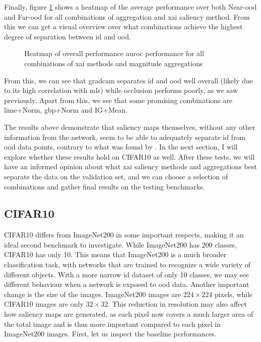 \documentclass[UKenglish]{uiomasterthesis} %
\theoremstyle{definition}
\begin{document}
Finally, figure \ref{fig:imagenet200_heatmap} shows a heatmap of the average performance over both Near-\ac{ood} and Far-\ac{ood} for all combinations of aggregation and \ac{xai} saliency method. From this we can get a visual overview over what combinations achieve the highest degree of separation between \ac{id} and \ac{ood}.

\begin{figure}[H]
    \begin{center}
        
    \end{center}
    \caption[Overall performance on ImageNet200]{Heatmap of overall performance \ac{auroc} performance for all combinations of \ac{xai} methods and magnitude aggregations}
    \label{fig:imagenet200_heatmap}
\end{figure}

From this, we can see that \ac{gradcam} separates \ac{id} and \ac{ood} well overall (likely due to its high correlation with \ac{mls}) while occlusion performs poorly, as we saw previously. Apart from this, we see that some promising combinations are \ac{lime}+Norm, \ac{gbp}+Norm and IG+Mean.

The results above demonstrate that saliency maps themselves, without any other information from the network, seem to be able to adequately separate \ac{id} from \ac{ood} data points, contrary to what was found by \cite{martinez}. In the next section, I will explore whether these results hold on CIFAR10 as well. After these tests, we will have an informed opinion about what \ac{xai} saliency methods and aggregations best separate the data on the validation set, and we can choose a selection of combinations and gather final results on the testing benchmarks.

\subsection{CIFAR10}

CIFAR10 differs from ImageNet200 in some important respects, making it an ideal second benchmark to investigate. While ImageNet200 has 200 classes, CIFAR10 has only 10. This means that ImageNet200 is a much broader classification task, with networks that are trained to recognize a wide variety of different objects. With a more narrow \ac{id} dataset of only 10 classes, we may see different behaviour when a network is exposed to \ac{ood} data. Another important change is the size of the images. ImageNet200 images are $224 \times 224$ pixels, while CIFAR10 images are only $32 \times 32$. This reduction in resolution may also affect how saliency maps are generated, as each pixel now covers a much larger area of the total image and is thus more important compared to each pixel in ImageNet200 images. First, let us inspect the baseline performances.
\end{document}
